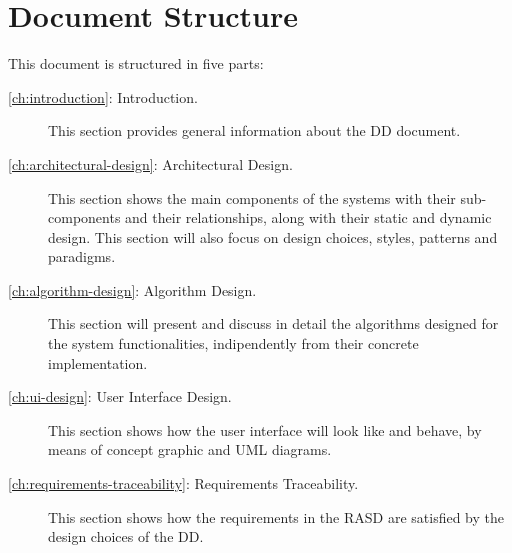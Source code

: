 \section{Document Structure}
\label{sec:structure}

This document is structured in five parts:
\begin{description}
\item[\autoref{ch:introduction}: Introduction.] This section provides general information about the DD document.
\item[\autoref{ch:architectural-design}: Architectural Design.] This section shows the main components of the systems with their sub-components and their relationships, along with their static and dynamic design. This section will also focus on design choices, styles, patterns and paradigms.
\item[\autoref{ch:algorithm-design}: Algorithm Design.] This section will present and discuss in detail the algorithms designed for the system functionalities, indipendently from their concrete implementation.
\item[\autoref{ch:ui-design}: User Interface Design.] This section shows how the user interface will look like and behave, by means of concept graphic and UML diagrams.
\item[\autoref{ch:requirements-traceability}: Requirements Traceability.] This section shows how the requirements in the RASD are satisfied by the design choices of the DD.
\end{description}
